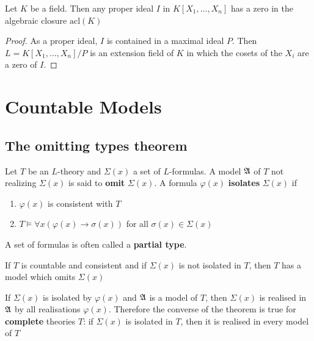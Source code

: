 \documentclass[11pt]{article}
\def \acl {\text{acl}}
\begin{document}
\begin{corollary}
Let \(K\) be a field. Then any proper ideal \(I\) in \(K[X_1,\dots,X_n]\) has a zero in the algebraic
closure \(\acl(K)\)
\end{corollary}

\begin{proof}
As a proper ideal, \(I\) is contained in a maximal ideal \(P\). Then \(L=K[X_1,\dots,X_n]/P\) is an
extension field of \(K\) in which the cosets of the \(X_i\) are a zero of \(I\).
\end{proof}


\section{Countable Models}
\label{sec:org3eb3ee8}
\subsection{The omitting types theorem}
\label{sec:org5ffbf93}
\begin{definition}[]
Let \(T\) be an \(L\)-theory and \(\Sigma(x)\) a set of \(L\)-formulas. A model
\(\mathfrak{A}\) of \(T\) not realizing \(\Sigma(x)\) is said to \textbf{omit} \(\Sigma(x)\). A
formula \(\varphi(x)\) \textbf{isolates} \(\Sigma(x)\) if
\begin{enumerate}
\item \(\varphi(x)\) is consistent with \(T\)
\item \(T\vDash\forall x(\varphi(x)\to\sigma(x))\) for all \(\sigma(x)\in\Sigma(x)\)
\end{enumerate}
\end{definition}

A set of formulas is often called a \textbf{partial type}.

\begin{theorem}
If \(T\) is countable and consistent and if \(\Sigma(x)\) is not isolated in
\(T\), then \(T\) has a model which omits \(\Sigma(x)\)
\end{theorem}

If \(\Sigma(x)\) is isolated by \(\varphi(x)\) and \(\mathfrak{A}\) is a model of \(T\), then
\(\Sigma(x)\) is realised in \(\mathfrak{A}\) by all realisations \(\varphi(x)\). Therefore the
converse of the theorem is true for \textbf{complete} theories \(T\): if \(\Sigma(x)\) is
isolated in \(T\), then it is realised in every model of \(T\) 
\end{document}

